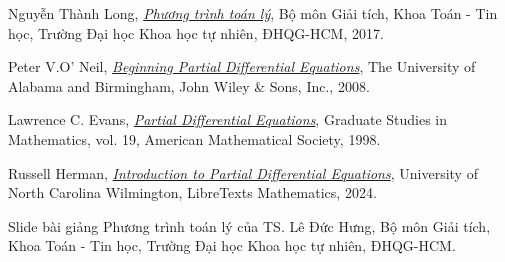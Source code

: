 \documentclass[10pt, a4paper]{article}
\begin{document}
\newpage
\begin{thebibliography}{1}
 Nguyễn Thành Long, \textit{\href{https://drive.google.com/file/d/1RPRrqId9-08bfTKazocns1gklrmpyDrM/view?usp=drive_link}{Phương trình toán lý}}, Bộ môn Giải tích, Khoa Toán - Tin học, Trường Đại học Khoa học tự nhiên, ĐHQG-HCM, 2017.

 Peter V.O' Neil, \textit{\href{https://libgen.is/book/index.php?md5=D24358102866676081EED6FF319C84E6}{Beginning Partial Differential Equations}}, The University of Alabama and Birmingham, John Wiley \& Sons, Inc., 2008.

 Lawrence C. Evans, \textit{\href{https://libgen.is/book/index.php?md5=6D9DF85A10396346D4CD5261DEE06AC4}{Partial Differential Equations}}, Graduate Studies in Mathematics, vol. 19, American Mathematical Society, 1998.

 Russell Herman, \textit{\href{https://math.libretexts.org/Bookshelves/Differential_Equations/Introduction_to_Partial_Differential_Equations_(Herman)}{Introduction to Partial Differential Equations}}, University of North Carolina Wilmington, LibreTexts Mathematics, 2024.

 Slide bài giảng Phương trình toán lý của TS. Lê Đức Hưng, Bộ môn Giải tích, Khoa Toán - Tin học, Trường Đại học Khoa học tự nhiên, ĐHQG-HCM.
\end{thebibliography}
\end{document}
